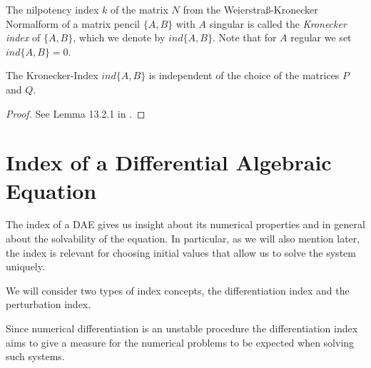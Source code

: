 \begin{definition}
	The nilpotency index $k$ of the matrix $N$ from the Weierstraß-Kronecker Normalform of a matrix pencil $\{A,B\}$ with $A$ singular is called the \emph{Kronecker index} of $\{A,B\}$, which we denote by $ind\{A,B\}$. Note that for $A$ regular we set $ind\{A,B\} = 0$.
\end{definition}


\begin{lemma}
	\label{Lemma:indipendence of Kronecker index}
	The Kronecker-Index $ind\{A,B\}$ is independent of the choice of the matrices $P$ and $Q$.
\end{lemma}

\begin{proof}
	See Lemma 13.2.1 in .
\end{proof}





\section{Index of a Differential Algebraic Equation}

The index of a DAE gives us insight about its numerical properties and in general about the solvability of the equation. In particular, as we will also mention later, the index is relevant for choosing initial values that allow us to solve the system uniquely.

We will consider two types of index concepts, the differentiation index and the perturbation index.

Since numerical differentiation is an unstable procedure the differentiation index aims to give a measure for the numerical problems to be expected when solving such systems.

